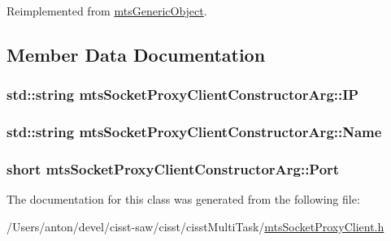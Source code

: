 Reimplemented from \hyperlink{classmts_generic_object_a4916a6c62ee5b167d7c93c88ab72523a}{mts\+Generic\+Object}.



\subsection{Member Data Documentation}
\hypertarget{classmts_socket_proxy_client_constructor_arg_a86c3db84d1fd5663615915a4aa455845}{}
\subsubsection[{I\+P}]{\setlength{\rightskip}{0pt plus 5cm}std\+::string mts\+Socket\+Proxy\+Client\+Constructor\+Arg\+::\+I\+P}\label{classmts_socket_proxy_client_constructor_arg_a86c3db84d1fd5663615915a4aa455845}
\hypertarget{classmts_socket_proxy_client_constructor_arg_a750e2b218eac14034166d2c4614cd2bf}{}
\subsubsection[{Name}]{\setlength{\rightskip}{0pt plus 5cm}std\+::string mts\+Socket\+Proxy\+Client\+Constructor\+Arg\+::\+Name}\label{classmts_socket_proxy_client_constructor_arg_a750e2b218eac14034166d2c4614cd2bf}
\hypertarget{classmts_socket_proxy_client_constructor_arg_ab036fe588319de186ec63d6cf4900bc7}{}
\subsubsection[{Port}]{\setlength{\rightskip}{0pt plus 5cm}short mts\+Socket\+Proxy\+Client\+Constructor\+Arg\+::\+Port}\label{classmts_socket_proxy_client_constructor_arg_ab036fe588319de186ec63d6cf4900bc7}


The documentation for this class was generated from the following file\+:\begin{DoxyCompactItemize}
\item 
/\+Users/anton/devel/cisst-\/saw/cisst/cisst\+Multi\+Task/\hyperlink{mts_socket_proxy_client_8h}{mts\+Socket\+Proxy\+Client.\+h}\end{DoxyCompactItemize}
